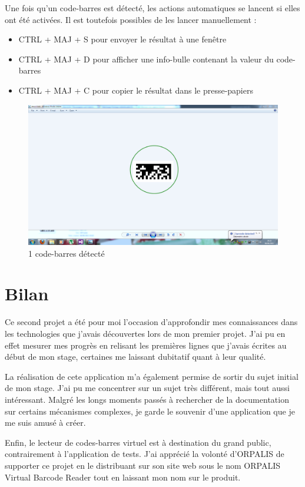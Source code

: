 Une fois qu'un code-barres est détecté, les actions automatiques se lancent si elles ont été activées. Il est toutefois possibles de les lancer manuellement :
\begin{itemize}
\item CTRL + MAJ + S pour envoyer le résultat à une fenêtre
\item CTRL + MAJ + D pour afficher une info-bulle contenant la valeur du code-barres
\item CTRL + MAJ + C pour copier le résultat dans le presse-papiers
\end{itemize}

\begin{figure}
\begin{center}
\includegraphics[scale=0.3]{images/detected.png}
\end{center}
\caption{1 code-barres détecté}
\label{detectedBarcode}
\end{figure}

\clearpage

\section{Bilan}

Ce second projet a été pour moi l'occasion d'approfondir mes connaissances dans les technologies que j'avais découvertes lors de mon premier projet. J'ai pu en effet mesurer mes progrès en relisant les premières lignes que j'avais écrites au début de mon stage, certaines me laissant dubitatif quant à leur qualité.

La réalisation de cete application m'a également permise de sortir du sujet initial de mon stage. J'ai pu me concentrer sur un sujet très différent, mais tout aussi intéressant. Malgré les longs moments passés à rechercher de la documentation sur certains mécanismes complexes, je garde le souvenir d'une application que je me suis amusé à créer.

Enfin, le lecteur de codes-barres virtuel est à destination du grand public, contrairement à l'application de tests. J'ai apprécié la volonté d'ORPALIS de supporter ce projet en le distribuant sur son site web sous le nom \og ORPALIS Virtual Barcode Reader \fg{} tout en laissant mon nom sur le produit.
